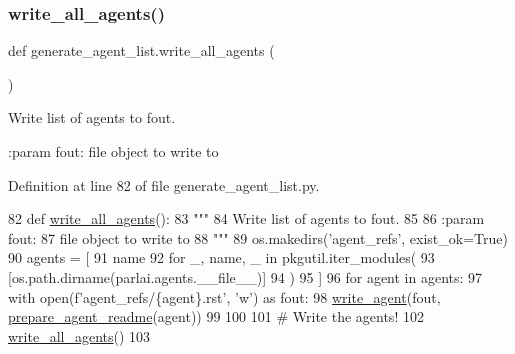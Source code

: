 \mbox{\label{namespacegenerate__agent__list_a27877babb0738c546513fb040748be63}} 
\subsubsection{\texorpdfstring{write\+\_\+all\+\_\+agents()}{write\_all\_agents()}}
{\footnotesize\ttfamily def generate\+\_\+agent\+\_\+list.\+write\+\_\+all\+\_\+agents (\begin{DoxyParamCaption}{ }\end{DoxyParamCaption})}

\begin{DoxyVerb}Write list of agents to fout.

:param fout:
    file object to write to
\end{DoxyVerb}
 

Definition at line 82 of file generate\+\_\+agent\+\_\+list.\+py.


\begin{DoxyCode}
82 \textcolor{keyword}{def }\hyperlink{namespacegenerate__agent__list_a27877babb0738c546513fb040748be63}{write\_all\_agents}():
83     \textcolor{stringliteral}{"""}
84 \textcolor{stringliteral}{    Write list of agents to fout.}
85 \textcolor{stringliteral}{}
86 \textcolor{stringliteral}{    :param fout:}
87 \textcolor{stringliteral}{        file object to write to}
88 \textcolor{stringliteral}{    """}
89     os.makedirs(\textcolor{stringliteral}{'agent\_refs'}, exist\_ok=\textcolor{keyword}{True})
90     agents = [
91         name
92         \textcolor{keywordflow}{for} \_, name, \_ \textcolor{keywordflow}{in} pkgutil.iter\_modules(
93             [os.path.dirname(parlai.agents.\_\_file\_\_)]
94         )
95     ]
96     \textcolor{keywordflow}{for} agent \textcolor{keywordflow}{in} agents:
97         with open(f\textcolor{stringliteral}{'agent\_refs/\{agent\}.rst'}, \textcolor{stringliteral}{'w'}) \textcolor{keyword}{as} fout:
98             \hyperlink{namespacegenerate__agent__list_aa2e399b6d39f8bb4e2f2ef644f082ac7}{write\_agent}(fout, \hyperlink{namespacegenerate__agent__list_a321a9312fef0cf377ee0e8a870ee0741}{prepare\_agent\_readme}(agent))
99 
100 
101 \textcolor{comment}{# Write the agents!}
102 \hyperlink{namespacegenerate__agent__list_a27877babb0738c546513fb040748be63}{write\_all\_agents}()
103 \end{DoxyCode}
